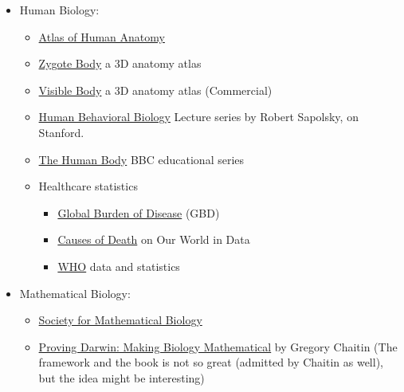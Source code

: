 \documentclass{article}
\begin{document}
\begin{itemize}
    \item Human Biology:
    \begin{itemize}
        \item \href{https://www.goodreads.com/book/show/45843.Atlas_of_Human_Anatomy}{Atlas of Human Anatomy}
        \item \href{https://www.zygotebody.com/}{Zygote Body} a 3D anatomy atlas
        \item \href{https://www.visiblebody.com/en-us/}{Visible Body} a 3D anatomy atlas (Commercial)
        \item \href{https://www.youtube.com/playlist?list=PL848F2368C90DDC3D}{Human Behavioral Biology} Lecture series by Robert Sapolsky, on Stanford.
        \item \href{https://www.imdb.com/title/tt0200346/}{The Human Body} BBC educational series
        \item Healthcare statistics
        \begin{itemize}
            \item \href{https://vizhub.healthdata.org/gbd-compare/}{Global Burden of Disease} (GBD)
            \item \href{https://ourworldindata.org/causes-of-death}{Causes of Death} on Our World in Data
            \item \href{https://www.who.int/data/gho}{WHO} data and statistics
        \end{itemize}
    \end{itemize}
    
    \item Mathematical Biology:
    \begin{itemize}
        \item \href{https://www.smb.org/}{Society for Mathematical Biology}
        \item \href{https://www.goodreads.com/book/show/13151411-proving-darwin}{Proving Darwin: Making Biology Mathematical} by Gregory Chaitin (The framework and the book is not so great (admitted by Chaitin as well), but the idea might be interesting)
    \end{itemize}
    

\end{itemize}
\end{document}
